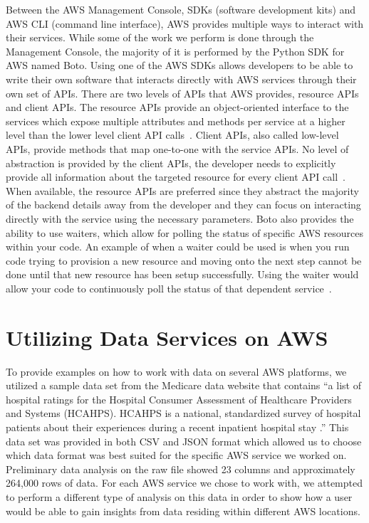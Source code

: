 Between the AWS Management Console, SDKs (software development kits) and AWS 
CLI (command line interface), AWS provides multiple ways to interact with 
their services. While some of the work we perform is done through the 
Management Console, the majority of it is performed by the Python SDK for 
AWS named Boto. Using one of the AWS SDKs allows developers to be able to 
write their own software that interacts directly with AWS services through 
their own set of APIs. There are two levels of APIs that AWS provides, 
resource APIs and client APIs. The resource APIs provide an object-oriented 
interface to the services which expose multiple attributes and methods per 
service at a higher level than the lower level client API 
calls~\cite{hid-sp18-521-BotoResources}. Client APIs, also called low-level 
APIs, provide methods that map one-to-one with the service APIs. No level of 
abstraction is provided by the client APIs, the developer needs to explicitly 
provide all information about the targeted resource for every client API 
call~\cite{hid-sp18-521-BotoClients}. When available, the resource APIs are 
preferred since they abstract the majority of the backend details away from 
the developer and they can focus on interacting directly with the service 
using the necessary parameters. Boto also provides the ability to use 
waiters, which allow for polling the status of specific AWS resources within 
your code. An example of when a waiter could be used is when you run code 
trying to provision a new resource and moving onto the next step cannot be 
done until that new resource has been setup successfully. Using the waiter 
would allow your code to continuously poll the status of that dependent 
service~\cite{hid-sp18-521-pythonsdk}.

\section{Utilizing Data Services on AWS}

To provide examples on how to work with data on several AWS platforms, we 
utilized a sample data set from the Medicare data website that contains ``a 
list of hospital ratings for the Hospital Consumer Assessment of Healthcare 
Providers and Systems (HCAHPS). HCAHPS is a national, standardized survey of 
hospital patients about their experiences during a recent inpatient hospital 
stay \cite{hid-sp18-521-MedicareData}.'' This data set was provided in both CSV 
and JSON format which allowed us to choose which data format was best suited 
for the specific AWS service we worked on. Preliminary data analysis on the 
raw file showed 23 columns and approximately 264,000 rows of data. For each 
AWS service we chose to work with, we attempted to perform a different type of 
analysis on this data in order to show how a user would be able to gain 
insights from data residing within different AWS locations. 

